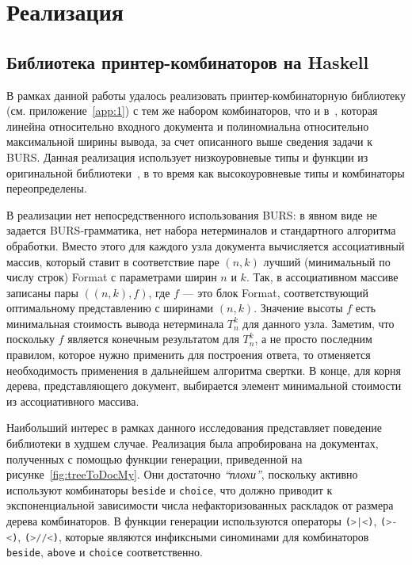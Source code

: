 \section{Реализация}



\newpage
\subsection{Библиотека принтер-комбинаторов на Haskell}

В рамках данной работы удалось реализовать
принтер-комбинаторную библиотеку (см. приложение~\ref{app:1}) с тем же набором комбинаторов,
что и в~\cite{swierstra},
которая линейна относительно входного документа и полиномиальна
относительно максимальной ширины вывода, за счет описанного выше сведения задачи к BURS.
Данная реализация использует низкоуровневые типы и функции из оригинальной
библиотеки~\cite{swierstra}, в то время как высокоуровневые типы и комбинаторы переопределены.

В реализации нет непосредственного использования BURS: в явном виде не задается BURS-грамматика,
нет набора нетерминалов и стандартного алгоритма обработки.
Вместо этого для каждого узла документа вычисляется ассоциативный массив, который
ставит в соответствие паре $(n, k)$ лучший (минимальный по числу строк) Format с параметрами
ширин $n$ и $k$. Так, в ассоциативном массиве записаны пары $((n, k), f)$, где $f$ --- это
блок Format, соответствующий оптимальному представлению с ширинами $(n, k)$. Значение
высоты $f$ есть минимальная стоимость вывода нетерминала $T^k_n$ для данного узла.
Заметим, что поскольку $f$ является конечным результатом для $T^k_n$, а не просто
последним правилом, которое нужно применить для построения ответа, то отменяется
необходимость применения в дальнейшем алгоритма свертки.
В конце, для корня дерева, представляющего документ, выбирается элемент минимальной стоимости из
ассоциативного массива.

Наибольший интерес в рамках данного исследования представляет поведение библиотеки
в худшем случае.
Реализация была апробирована на документах, полученных с помощью
функции генерации, приведенной на рисунке~\ref{fig:treeToDocMy}. Они достаточно
\emph{``плохи''}, поскольку активно используют комбинаторы
\lstinline[language= Haskell]{beside} и
\lstinline[language= Haskell]{choice}, что должно приводит к экспоненциальной зависимости
числа нефакторизованных раскладок от размера дерева комбинаторов.
В функции генерации используются операторы
\lstinline[language= Haskell]{(>|<)},
\lstinline[language= Haskell]{(>-<)},
\lstinline[language= Haskell]{(>//<)}, которые являются инфиксными синоминами для
комбинаторов
\lstinline[language= Haskell]{beside},
\lstinline[language= Haskell]{above} и
\lstinline[language= Haskell]{choice} соответственно.

